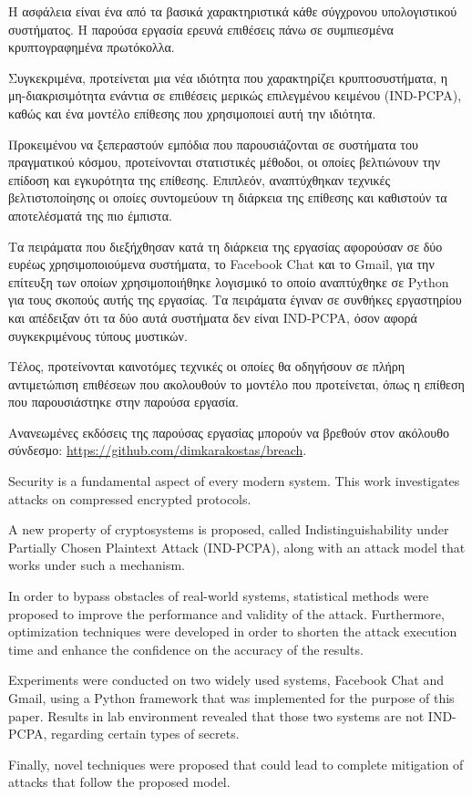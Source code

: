 \begin{abstractgr}

Η ασφάλεια είναι ένα από τα βασικά χαρακτηριστικά κάθε σύγχρονου υπολογιστικού
συστήματος. Η παρούσα εργασία ερευνά επιθέσεις πάνω σε συμπιεσμένα
κρυπτογραφημένα πρωτόκολλα.

Συγκεκριμένα, προτείνεται μια νέα ιδιότητα που χαρακτηρίζει κρυπτοσυστήματα, η
μη-διακρισιμότητα ενάντια σε επιθέσεις μερικώς επιλεγμένου κειμένου (IND-PCPA),
καθώς και ένα μοντέλο επίθεσης που χρησιμοποιεί αυτή την ιδιότητα.

Προκειμένου να ξεπεραστούν εμπόδια που παρουσιάζονται σε συστήματα του
πραγματικού κόσμου, προτείνονται στατιστικές μέθοδοι, οι οποίες βελτιώνουν την
επίδοση και εγκυρότητα της επίθεσης. Επιπλεόν, αναπτύχθηκαν τεχνικές
βελτιστοποίησης οι οποίες συντομεύουν τη διάρκεια της επίθεσης και καθιστούν τα
αποτελέσματά της πιο έμπιστα.

Τα πειράματα που διεξήχθησαν κατά τη διάρκεια της εργασίας αφορούσαν σε δύο
ευρέως χρησιμοποιούμενα συστήματα, το Facebook Chat και το Gmail, για την
επίτευξη των οποίων χρησιμοποιήθηκε λογισμικό το οποίο αναπτύχθηκε σε Python
για τους σκοπούς αυτής της εργασίας. Τα πειράματα έγιναν σε συνθήκες εργαστηρίου
και απέδειξαν ότι τα δύο αυτά συστήματα δεν είναι IND-PCPA, όσον αφορά
συγκεκριμένους τύπους μυστικών.

Τέλος, προτείνονται καινοτόμες τεχνικές οι οποίες θα οδηγήσουν σε πλήρη
αντιμετώπιση επιθέσεων που ακολουθούν το μοντέλο που προτείνεται, όπως η
επίθεση που παρουσιάστηκε στην παρούσα εργασία.

Ανανεωμένες εκδόσεις της παρούσας εργασίας μπορούν να βρεθούν στον ακόλουθο
σύνδεσμο: \url{https://github.com/dimkarakostas/breach}.

\end{abstractgr}

\begin{abstracten}

Security is a fundamental aspect of every modern system. This work investigates
attacks on compressed encrypted protocols.

A new property of cryptosystems is proposed, called Indistinguishability under
Partially Chosen Plaintext Attack (IND-PCPA), along with an attack model that
works under such a mechanism.

In order to bypass obstacles of real-world systems, statistical methods were
proposed to improve the performance and validity of the attack. Furthermore,
optimization techniques were developed in order to shorten the attack execution
time and enhance the confidence on the accuracy of the results.

Experiments were conducted on two widely used systems, Facebook Chat and Gmail, using
a Python framework that was implemented for the purpose of this paper. Results
in lab environment revealed that those two systems are not IND-PCPA, regarding
certain types of secrets.

Finally, novel techniques were proposed that could lead to complete mitigation
of attacks that follow the proposed model.

\end{abstracten}

